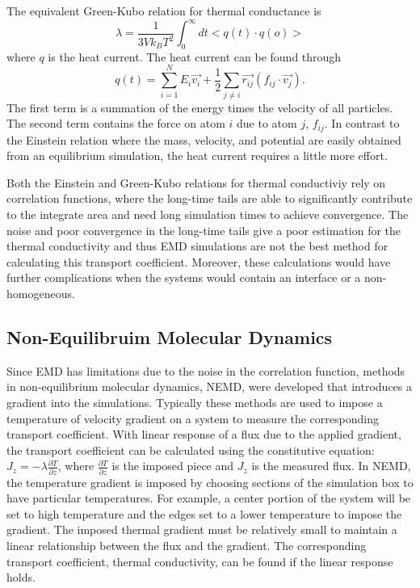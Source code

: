 The equivalent Green-Kubo relation for thermal conductance is
\begin{equation}
    \lambda = \frac{1}{3Vk_BT^2}\int^\infty_0 dt <q(t) \cdot q(o)>
\end{equation}
where $q$ is the heat current.
The heat current can be found through
\begin{equation}
    q(t) = \sum^N_{i=1} E_i \vec{v_i} + \frac{1}{2}\sum_{j \neq i} \vec{r_{ij}} (f_{ij} \cdot \vec{v_j}).
\end{equation}
The first term is a summation of the energy times the velocity of all particles. The second term contains the force on atom $i$ due to atom $j$, $f_{ij}$.
In contrast to the Einstein relation where the mass, velocity, and potential are easily obtained from an equilibrium simulation, the heat current requires a little more effort.

Both the Einstein and Green-Kubo relations for thermal conductiviy rely on correlation functions, where the long-time tails are able to significantly contribute to the integrate area and need long simulation times to achieve convergence.
The noise and poor convergence in the long-time tails give a poor estimation for the thermal conductivity and thus EMD simulations are not the best method for calculating this transport coefficient.
Moreover, these calculations would have further complications when the systems would contain an interface or a non-homogeneous.

\subsection{Non-Equilibruim Molecular Dynamics}
Since EMD has limitations due to the noise in the correlation function, methods in non-equilibrium molecular dynamics, NEMD, were developed that introduces a gradient into the simulations.\cite{Backer:2005sf,Hess:2002nr,Picalek:2009rz, Vasquez:2004ty}
Typically these methods are used to impose a temperature of velocity gradient on a system to measure the corresponding transport coefficient. \cite{Evans:1982oq, Erpenbeck:1984qe, Evans:1986nx, Vogelsang:1988qv, Maginn:1993kl, Hess:2002nr, Schelling:2002dp, Berthier:2002ai, Evans:2002tg, Vasquez:2004ty, Backer:2005sf, Jiang:2008hc, Picalek:2009rz}
With linear response of a flux due to the applied gradient, the transport coefficient can be calculated using the constitutive equation: $J_z = -\lambda \frac{\partial T}{\partial z}$, where $\frac{\partial T}{\partial z}$ is the imposed piece and $J_z$ is the measured flux.
In NEMD, the temperature gradient is imposed by choosing sections of the simulation box to have particular temperatures. For example, a center portion of the system will be set to high temperature and the edges set to a lower temperature to impose the gradient. 
The imposed thermal gradient must be relatively small to maintain a linear relationship between the flux and the gradient. 
The corresponding transport coefficient, thermal conductivity, can be found if the linear response holds.

